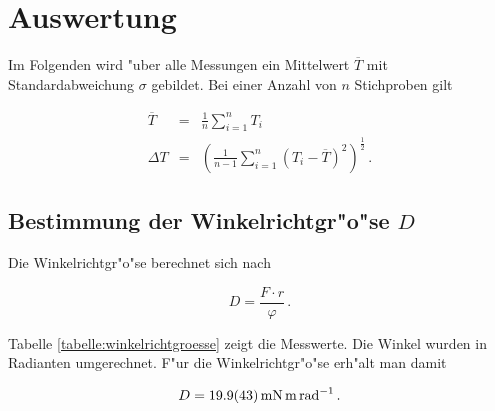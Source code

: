 \section{Auswertung}
\label{sec:auswertung}

	Im Folgenden wird "uber alle Messungen ein Mittelwert $\overline{T}$ mit Standardabweichung $\sigma$ gebildet.
	Bei einer Anzahl von $n$ Stichproben gilt

	\begin{eqnarray}
		\overline{T} & = & \frac{1}{n} \sum_{i = 1}^n{T_i} \nonumber \\
		\Delta T & = & \left(\frac{1}{n-1}\sum_{i = 1}^n {(T_i - \overline{T})^2}\right)^{\frac{1}{2}} \,. \nonumber
	\end{eqnarray}


	\subsection{Bestimmung der Winkelrichtgr"o"se $D$}
	\label{subsec:winkelrichtgroesse}
		Die Winkelrichtgr"o"se berechnet sich nach

		\begin{equation*}
			D = \frac{F \cdot r}{\varphi} \,.
		\end{equation*}

		Tabelle \ref{tabelle:winkelrichtgroesse} zeigt die Messwerte.
		Die Winkel wurden in Radianten umgerechnet.
		F"ur die Winkelrichtgr"o"se erh"alt man damit

		\begin{equation*}
			D = \SI{19.9 (43)}{\milli \newton \meter \per \radian} \,.
		\end{equation*}



